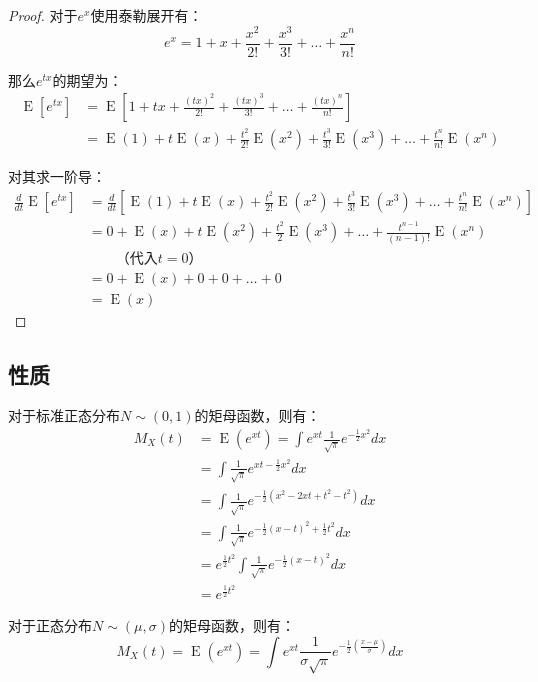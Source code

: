 \documentclass[11pt]{article}
\newcommand{\E}{\operatorname{E}}
\begin{document}
\begin{proof}
    对于$e^x$使用泰勒展开有：
    \begin{equation*}
        e^x = 1 + x + \frac{x^2}{2!} + \frac{x^3}{3!} + \dots + \frac{x^n}{n!}
    \end{equation*}

    那么$e^{tx}$的期望为：
    \begin{align*}
        \E[e^{tx}] &= \E\left[1 + tx + \frac{(tx)^2}{2!} + \frac{(tx)^3}{3!} + \dots + \frac{(tx)^n}{n!} \right] \\
        &= \E(1) + t\E(x) + \frac{t^2}{2!}\E(x^2) + \frac{t^3}{3!}\E(x^3) + \dots + \frac{t^n}{n!}\E(x^n) 
    \end{align*}

    对其求一阶导：
    \begin{align*}
        \frac{d}{dt} \E[e^{tx}] 
        &= \frac{d}{dt} \left[ \E(1) + t\E(x) + \frac{t^2}{2!}\E(x^2) + \frac{t^3}{3!}\E(x^3) + \dots + \frac{t^n}{n!}\E(x^n) \right] \\
        &= 0 + \E(x) + t\E(x^2) + \frac{t^2}{2}\E(x^3) + \dots + \frac{t^{n-1}}{(n-1)!}\E(x^n) \\
        & \qquad \text{（代入$t=0$）} \\
        &= 0 + \E(x) + 0 + 0 + \dots + 0 \\
        &= \E(x) 
    \end{align*}
\end{proof}

\subsection{性质}

对于标准正态分布$N\sim(0,1)$的矩母函数，则有：
\begin{align*}
    M_X(t) &= \E (e^{xt}) = \int e^{xt} \frac{1}{\sqrt{\pi}} e^{-\frac{1}{2}x^2}dx \\
    &= \int \frac{1}{\sqrt{\pi}} e^{xt-\frac{1}{2}x^2}dx \\
    &= \int \frac{1}{\sqrt{\pi}} e^{-\frac{1}{2} (x^2 -2xt + t^2 -t^2)}dx \\
    &= \int \frac{1}{\sqrt{\pi}} e^{-\frac{1}{2} (x-t)^2 + \frac{1}{2}t^2}dx \\
    &= e^{\frac{1}{2} t^2} \int \frac{1}{\sqrt{\pi}} e^{-\frac{1}{2} (x-t)^2 }dx \\
    &= e^{\frac{1}{2} t^2}
\end{align*}

对于正态分布$N\sim(\mu,\sigma)$的矩母函数，则有：
\begin{equation*}
    M_X(t) = \E (e^{xt}) = \int e^{xt} \frac{1}{\sigma\sqrt{\pi}} e^{-\frac{1}{2} \left( \frac{x-\mu}{\sigma} \right)} dx
\end{equation*}
\end{document}
